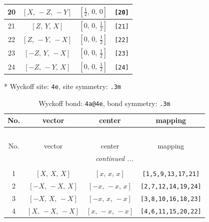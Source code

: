 \documentclass[fleqn,8pt]{jsarticle}
\begin{document}
\begin{longtable}{cccc}
20 & $\left[ X,\, - Z,\, - Y \right]$ & $\left[ \frac{1}{2},\, 0,\, 0 \right]$ & {\tt [20]} \\ \hline
21 & $\left[ Z,\, Y,\, X \right]$ & $\left[ 0,\, 0,\, \frac{1}{2} \right]$ & {\tt [21]} \\ \hline
22 & $\left[ Z,\, - Y,\, - X \right]$ & $\left[ 0,\, 0,\, \frac{1}{2} \right]$ & {\tt [22]} \\ \hline
23 & $\left[ - Z,\, Y,\, - X \right]$ & $\left[ 0,\, 0,\, \frac{1}{2} \right]$ & {\tt [23]} \\ \hline
24 & $\left[ - Z,\, - Y,\, X \right]$ & $\left[ 0,\, 0,\, \frac{1}{2} \right]$ & {\tt [24]} \\
\end{longtable}
* Wyckoff site: {\tt 4e}, site symmetry: {\tt .3m}
\renewcommand{\arraystretch}{1.2}
\begin{longtable}{cccc}
\caption{Wyckoff bond: {\tt 4a@4e}, bond symmetry: {\tt .3m}}
 \\
 \hline \hline
No. & vector & center & mapping \\ \hline \endfirsthead

\multicolumn{3}{l}{\tablename\ \thetable{}} \\
 \hline \hline
No. & vector & center & mapping \\ \hline \endhead

 \hline \hline
\multicolumn{3}{r}{\footnotesize\it continued ...} \\ \endfoot

 \hline \hline
\multicolumn{3}{r}{} \\ \endlastfoot

1 & $\left[ X,\, X,\, X \right]$ & $\left[ x,\, x,\, x \right]$ & {\tt [1,5,9,13,17,21]} \\ \hline
2 & $\left[ - X,\, - X,\, X \right]$ & $\left[ - x,\, - x,\, x \right]$ & {\tt [2,7,12,14,19,24]} \\ \hline
3 & $\left[ - X,\, X,\, - X \right]$ & $\left[ - x,\, x,\, - x \right]$ & {\tt [3,8,10,16,18,23]} \\ \hline
4 & $\left[ X,\, - X,\, - X \right]$ & $\left[ x,\, - x,\, - x \right]$ & {\tt [4,6,11,15,20,22]} \\
\end{longtable}
\renewcommand{\arraystretch}{1.2}
\end{document}
